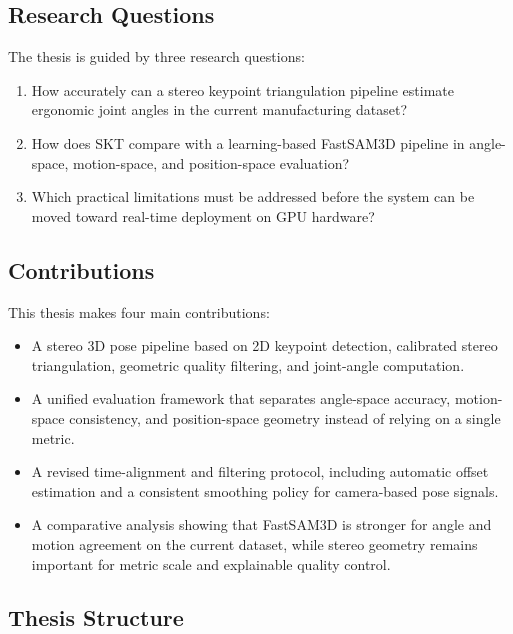 \documentclass[12pt,a4paper]{article}
\begin{document}
\subsection{Research Questions}

The thesis is guided by three research questions:

\begin{enumerate}[label=\textbf{RQ\arabic*:}, leftmargin=1.8cm]
  \item How accurately can a stereo keypoint triangulation pipeline estimate
        ergonomic joint angles in the current manufacturing dataset?
  \item How does SKT compare with a learning-based FastSAM3D pipeline in
        angle-space, motion-space, and position-space evaluation?
  \item Which practical limitations must be addressed before the system can be
        moved toward real-time deployment on GPU hardware?
\end{enumerate}

\subsection{Contributions}

This thesis makes four main contributions:

\begin{itemize}[leftmargin=1.2cm]
  \item A stereo 3D pose pipeline based on 2D keypoint detection, calibrated
        stereo triangulation, geometric quality filtering, and joint-angle
        computation.
  \item A unified evaluation framework that separates angle-space accuracy,
        motion-space consistency, and position-space geometry instead of relying
        on a single metric.
  \item A revised time-alignment and filtering protocol, including automatic
        offset estimation and a consistent smoothing policy for camera-based
        pose signals.
  \item A comparative analysis showing that FastSAM3D is stronger for angle and
        motion agreement on the current dataset, while stereo geometry remains
        important for metric scale and explainable quality control.
\end{itemize}

\subsection{Thesis Structure}
\end{document}
